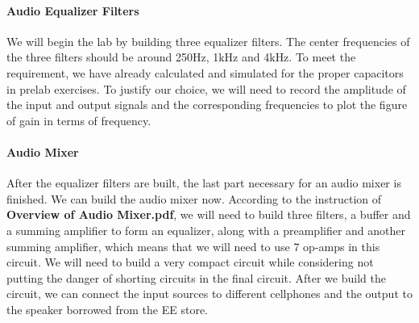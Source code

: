 \paragraph{Audio Equalizer Filters}
We will begin the lab by building three equalizer filters. The center frequencies of the three filters should be around 250$ \si{\hertz} $, 1$ \si{\kilo\hertz} $ and 4$ \si{\kilo\hertz} $. To meet the requirement, we have already calculated and simulated for the proper capacitors in prelab exercises. To justify our choice, we will need to record the amplitude of the input and output signals and the corresponding frequencies to plot the figure of gain in terms of frequency. 
\paragraph{Audio Mixer}
After the equalizer filters are built, the last part necessary for an audio mixer is finished. We can build the audio mixer now. According to the instruction of \textbf{Overview of Audio Mixer.pdf}, we will need to build three filters, a buffer and a summing amplifier to form an equalizer, along with a preamplifier and another summing amplifier, which means that we will need to use 7 op-amps in this circuit. We will need to build a very compact circuit while considering not putting the danger of shorting circuits in the final circuit. After we build the circuit, we can connect the input sources to different cellphones and the output to the speaker borrowed from the EE store.